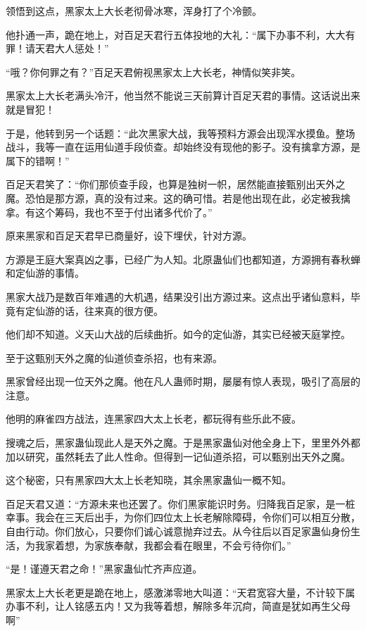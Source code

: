 \begin{this_body}
领悟到这点，黑家太上大长老彻骨冰寒，浑身打了个冷颤。

他扑通一声，跪在地上，对百足天君行五体投地的大礼：“属下办事不利，大大有罪！请天君大人惩处！”

“哦？你何罪之有？”百足天君俯视黑家太上大长老，神情似笑非笑。

黑家太上大长老满头冷汗，他当然不能说三天前算计百足天君的事情。这话说出来就是冒犯！

于是，他转到另一个话题：“此次黑家大战，我等预料方源会出现浑水摸鱼。整场战斗，我等一直在运用仙道手段侦查。却始终没有现他的影子。没有擒拿方源，是属下的错啊！”

百足天君笑了：“你们那侦查手段，也算是独树一帜，居然能直接甄别出天外之魔。恐怕是那方源，真的没有过来。这的确可惜。若是他出现在此，必定被我擒拿。有这个筹码，我也不至于付出诸多代价了。”

原来黑家和百足天君早已商量好，设下埋伏，针对方源。

方源是王庭大案真凶之事，已经广为人知。北原蛊仙们也都知道，方源拥有春秋蝉和定仙游的事情。

黑家大战乃是数百年难遇的大机遇，结果没引出方源过来。这点出乎诸仙意料，毕竟有定仙游的话，往来真的很方便。

他们却不知道。义天山大战的后续曲折。如今的定仙游，其实已经被天庭掌控。

至于这甄别天外之魔的仙道侦查杀招，也有来源。

黑家曾经出现一位天外之魔。他在凡人蛊师时期，屡屡有惊人表现，吸引了高层的注意。

他明的麻雀四方战法，连黑家四大太上长老，都玩得有些乐此不疲。

搜魂之后，黑家蛊仙现此人是天外之魔。于是黑家蛊仙对他全身上下，里里外外都加以研究，虽然耗去了此人性命。但得到一记仙道杀招，可以甄别出天外之魔。

这个秘密，只有黑家四大太上长老知晓，其余黑家蛊仙一概不知。

百足天君又道：“方源未来也还罢了。你们黑家能识时务。归降我百足家，是一桩幸事。我会在三天后出手，为你们四位太上长老解除障碍，令你们可以相互分散，自由行动。你们放心，只要你们诚心诚意抛弃过去。从今往后以百足家蛊仙身份生活，为我家着想，为家族奉献，我都会看在眼里，不会亏待你们。”

“是！谨遵天君之命！”黑家蛊仙忙齐声应道。

黑家太上大长老更是跪在地上，感激涕零地大叫道：“天君宽容大量，不计较下属办事不利，让人铭感五内！又为我等着想，解除多年沉疴，简直是犹如再生父母啊”


\end{this_body}
